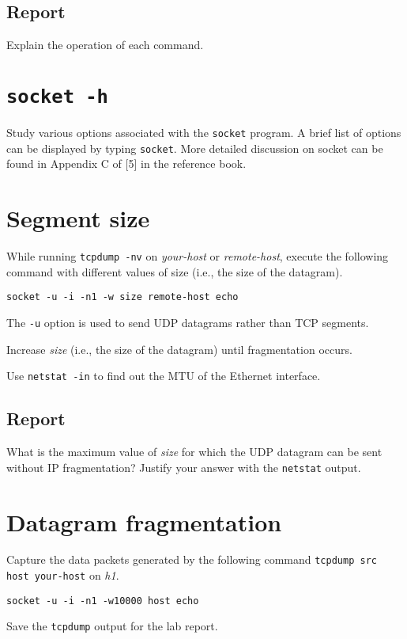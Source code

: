 \documentclass{../UTNetLab}
\begin{document}
	\subsection*{Report}
	Explain the operation of each command.

\section{\texttt{socket -h}}
	Study various options associated with the \lstinline{socket} program.
	A brief list of options can be displayed by typing \lstinline{socket}. More detailed discussion on socket can be found in
	Appendix C of [5] in the reference book.

\section{Segment size}
	While running \lstinline{tcpdump -nv} on \textit{your-host} or \textit{remote-host}, execute the following command with different values of size (i.e., the size of the datagram).

	\begin{lstlisting}[emph={size, remote-host}]
socket -u -i -n1 -w size remote-host echo
	\end{lstlisting}
	
    The \lstinline{-u} option is used to send UDP datagrams rather than TCP segments.

	Increase \textit{size} (i.e., the size of the datagram) until fragmentation occurs.

	Use \lstinline{netstat -in} to find out the MTU of the Ethernet interface.

	\subsection*{Report}
	What is the maximum value of \textit{size} for which the UDP datagram can be sent without IP fragmentation?
	Justify your answer with the \lstinline{netstat} output.

\section{Datagram fragmentation}
	Capture the data packets generated by the following command \lstinline[emph={your-host, remote-host}]{tcpdump src host your-host} on \textit{h1}.

	\begin{lstlisting}[emph={host}]
socket -u -i -n1 -w10000 host echo
	\end{lstlisting}
	Save the \lstinline{tcpdump} output for the lab report.
	
\end{document}
